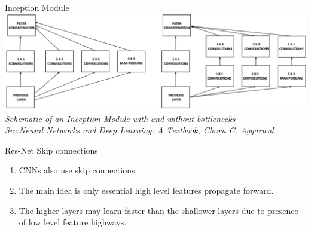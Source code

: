 \begin{frame}{Inception Module}
	\includegraphics[width=\textwidth]{images/Inception module with bottlenecks.png}
	\tiny{\textit{Schematic of an Inception Module with and without bottlenecks\\ Src:Neural Networks and Deep Learning: A Textbook, Charu C. Aggarwal }}
\end{frame}
\begin{frame}{Res-Net Skip connections}
	\begin{enumerate}[$\bullet$]
		\item CNNs also use skip connections
		\item The main idea is only essential high level features propagate forward.
		\item The higher layers may learn faster than the shallower layers due to presence of low level feature highways.
	\end{enumerate}
\end{frame}

